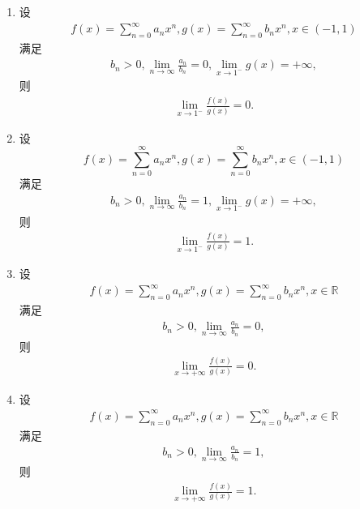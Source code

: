 \documentclass[../../main.tex]{subfiles}
\begin{document}
\begin{theorem}[幂级数系数的阶蕴含幂级数和函数的阶]\label{theorem:幂级数系数的阶蕴含幂级数和函数的阶}
\begin{enumerate}[(1)]
\item 设
\begin{align}
f(x) = \sum_{n=0}^{\infty} a_n x^n, g(x) = \sum_{n=0}^{\infty} b_n x^n, x \in (-1,1)
\end{align}
满足
\begin{align}
b_n > 0, \lim_{n \to \infty} \frac{a_n}{b_n} = 0, \lim_{x \to 1^-} g(x) = +\infty, \label{eq::::--::--12301749-19.1}
\end{align}
则
\begin{align}
\lim_{x \to 1^-} \frac{f(x)}{g(x)} = 0. \label{eq::::--::--12301349-19.1}
\end{align}

\item 设
\[
f(x) = \sum_{n=0}^{\infty} a_n x^n, g(x) = \sum_{n=0}^{\infty} b_n x^n, x \in (-1,1)
\]
满足
\begin{align}
b_n > 0, \lim_{n \to \infty} \frac{a_n}{b_n} = 1, \lim_{x \to 1^-} g(x) = +\infty, \label{eq::::--::--123349-19.1}
\end{align}
则
\begin{align}
\lim_{x \to 1^-} \frac{f(x)}{g(x)} = 1. \label{eq::::--::--1233241449-19.1}
\end{align}

\item 设
\begin{align}
f(x) = \sum_{n=0}^{\infty} a_n x^n, g(x) = \sum_{n=0}^{\infty} b_n x^n, x \in \mathbb{R}
\end{align}
满足
\begin{align}
b_n > 0, \lim_{n \to \infty} \frac{a_n}{b_n} = 0, \label{eq::::--::-2341233241449-19.1}
\end{align}
则
\begin{align}
\lim_{x \to +\infty} \frac{f(x)}{g(x)} = 0. \label{eq::::--::-233241449-19.1}
\end{align}

\item 设
\begin{align}
f(x) = \sum_{n=0}^{\infty} a_n x^n, g(x) = \sum_{n=0}^{\infty} b_n x^n, x \in \mathbb{R}
\end{align}
满足
\begin{align}
b_n > 0, \lim_{n \to \infty} \frac{a_n}{b_n} = 1, \label{eq::::--::-23412332449-19.1}
\end{align}
则
\begin{align}
\lim_{x \to +\infty} \frac{f(x)}{g(x)} = 1. \label{eq::::--::-2332419-19.1}
\end{align}
\end{enumerate}
\end{theorem}
\end{document}
